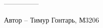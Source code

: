 \begin{figure}[h]

\begin{minipage}[h]{0.55\linewidth}
\end{minipage}
\begin{minipage}[h]{0.45\linewidth}
\end{minipage}
\end{figure}

---------------

Автор -- Тимур Гонтарь, М3206